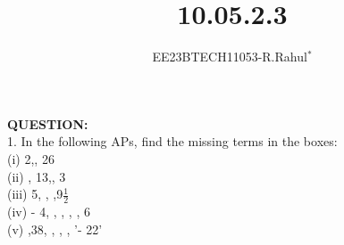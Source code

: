 \documentclass[journal,12pt,twocolumn]{IEEEtran}
\theoremstyle{remark}
\begin{document}

\vspace{3cm}
\title{\textbf{10.05.2.3}}
\author{EE23BTECH11053-R.Rahul$^{*}$%
}

\maketitle
\textbf{QUESTION:}
\\
1. In the following APs, find the missing terms in the boxes:\\
(i) 2,\textunderscore, 26 \\
(ii) \textunderscore, 13,\textunderscore , 3\\
(iii)  5,  \textunderscore, \textunderscore,9\(\frac{1}{2}\) \\
(iv) - 4, \textunderscore,  \textunderscore, \textunderscore, \textunderscore, 6\\
(v)  \textunderscore,38, \textunderscore, \textunderscore, \textunderscore, '- 22'\\

\solution
\fi

\end{document}
